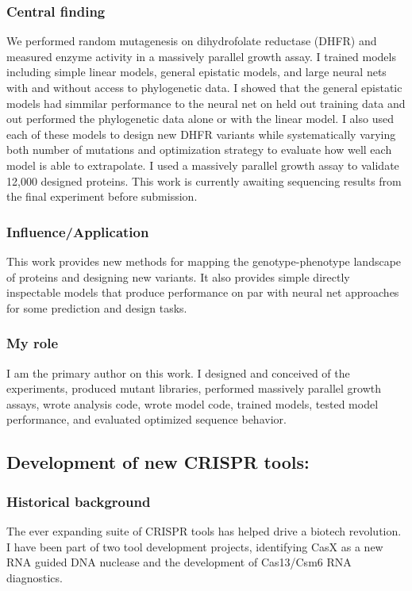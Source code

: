 \documentclass{article}
\begin{document}
\subsubsection{Central finding}
We performed random mutagenesis on dihydrofolate reductase (DHFR) and measured enzyme activity in a massively parallel growth assay. 
I trained models including simple linear models, general epistatic models, and large neural nets with and without access to phylogenetic data. 
I showed that the general epistatic models had simmilar performance to the neural net on held out training data and out performed the phylogenetic data alone or with the linear model. 
I also used each of these models to design new DHFR variants while systematically varying both number of mutations and optimization strategy to evaluate how well each model is able to extrapolate.
I used a massively parallel growth assay to validate 12,000 designed proteins.
This work is currently awaiting sequencing results from the final experiment before submission.
%
\subsubsection{Influence/Application}
This work provides new methods for mapping the genotype-phenotype landscape of proteins and designing new variants.
It also provides simple directly inspectable models that produce performance on par with neural net approaches for some prediction and design tasks.
%
\subsubsection{My role}
I am the primary author on this work.
I designed and conceived of the experiments, produced mutant libraries, performed massively parallel growth assays, wrote analysis code, wrote model code, trained models, tested model performance, and evaluated optimized sequence behavior.
%



\newrefsection
\subsection{Development of new CRISPR tools:}
\subsubsection{Historical background}
The ever expanding suite of CRISPR tools has helped drive a biotech revolution.
I have been part of two tool development projects, identifying CasX as a new RNA guided DNA nuclease and the development of Cas13/Csm6 RNA diagnostics.
%
\end{document}
